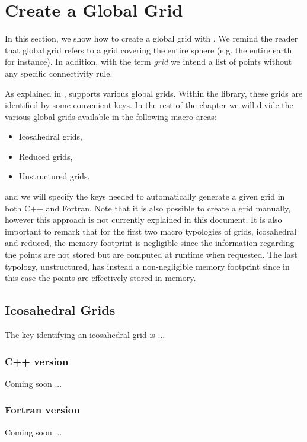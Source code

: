 \chapter{Create a Global Grid}
In this section, we show how to create a global grid with \Atlas.
We remind the reader that global grid refers to a grid covering 
the entire sphere (e.g. the entire earth for instance).
In addition, with the term \textit{grid} we intend a 
list of points without any specific connectivity rule.

As explained in , \Atlas supports various 
global grids. Within the library, these grids are identified 
by some convenient keys. In the rest of the chapter we will 
divide the various global grids available in the following 
macro areas:
%
\begin{itemize}
\item Icosahedral grids,
\item Reduced grids,
\item Unstructured grids.
\end{itemize} 
%
and we will specify the keys needed to automatically generate 
a given grid in both C++ and Fortran. Note that it is also possible 
to create a grid manually, however this approach is not currently 
explained in this document.
It is also important to remark that for the first two macro typologies 
of grids, icosahedral and reduced, the memory footprint is negligible 
since the information regarding the points are not stored but are computed
at runtime when requested.
The last typology, unstructured, has instead a non-negligible memory 
footprint since in this case the points are effectively stored in memory.



\section{Icosahedral Grids}
The key identifying an icosahedral grid is ...
 
\subsection{C++ version}
Coming soon ...

\subsection{Fortran version}
Coming soon ...



